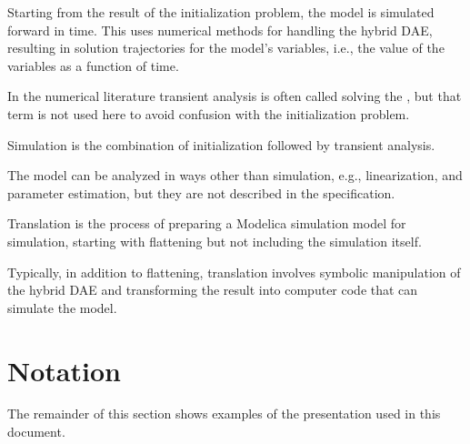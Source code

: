 \begin{definition}
Starting from the result of the initialization problem, the model is simulated forward in time.
This uses numerical methods for handling the hybrid DAE, resulting in solution trajectories for the model's variables, i.e., the value of the variables as a function of time.
\end{definition}

\begin{nonnormative}
In the numerical literature transient analysis is often called solving the , but that term is not used here to avoid confusion with the initialization problem.
\end{nonnormative}

\begin{definition}[Simulation]
Simulation is the combination of initialization followed by transient analysis.
\end{definition}

\begin{nonnormative}
The model can be analyzed in ways other than simulation, e.g., linearization, and parameter estimation, but they are not described in the specification.
\end{nonnormative}

\begin{definition}[Translation]
Translation is the process of preparing a Modelica simulation model for simulation, starting with flattening but not including the simulation itself.
\end{definition}

\begin{nonnormative}
Typically, in addition to flattening, translation involves symbolic manipulation of the hybrid DAE and transforming the result into computer code that can simulate the model.
\end{nonnormative}



\section{Notation}\label{notation}

The remainder of this section shows examples of the presentation used in this document.

